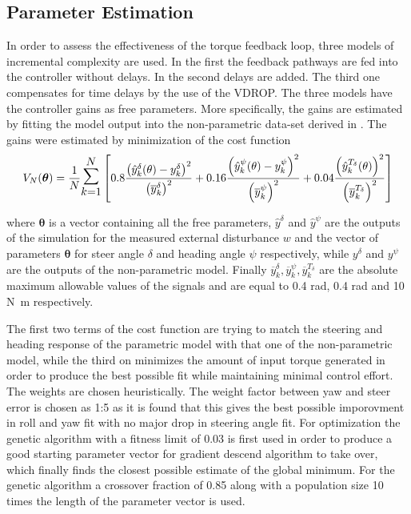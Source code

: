 \subsection{Parameter Estimation }

In order to assess the effectiveness of the torque feedback loop, three models of incremental complexity are used. In the first the feedback pathways are fed into the controller without delays. In the second delays are added. The third one compensates for time delays by the use of the VDROP. The three models have the  controller gains as free parameters. More specifically, the gains are estimated by fitting the model output into the non-parametric data-set derived in \cite{dialynaseffect}.  The gains were estimated by minimization of the cost function 
\begin{equation}
    V_{N}(\boldsymbol{\theta})=\frac{1}{N} \mathlarger{\mathlarger{\mathlarger{\sum}}}_{k=1}^{N}\left[0.8\frac{\left(\hat{y}^{\delta}_k(\mathbf{\theta})-y^\delta_k\right)^{2}}{\left(\overline{y}^{\delta}_k\right)^2}+0.16\frac{\left(\hat{y}^{\psi}_k(\mathbf{\theta})-y^\psi_k\right)^{2}}{\left(\overline{y}^{\psi}_k\right)^2}+0.04\frac{\left(\hat{y}^{T_\delta}_k(\mathbf{\theta})\right)^2}{\left(\overline{y}^{T_\delta}_k\right)^2}\right]
    \label{eq:cost}
    \end{equation}

where \ensuremath{\boldsymbol{\theta}} is a vector containing all the free parameters, \ensuremath{\hat{y}^{\delta}} and \ensuremath{\hat{y}^{\psi}} are the outputs of the simulation for the measured external disturbance \ensuremath{w} and the vector of parameters  \ensuremath{\boldsymbol{\theta}} for steer angle \ensuremath{\delta} and heading angle \ensuremath{\psi}  respectively, while \ensuremath{y^\delta} and \ensuremath{y^\psi} are the outputs of the non-parametric model. Finally \ensuremath{\overline{y}^{\delta}_k,\overline{y}^{\psi}_k,\overline{y}^{T_\delta}_k} are the absolute maximum allowable values of the  signals and are equal to 0.4 \si{\radian}, 0.4 \si{\radian} and 10 \si{N.m} respectively.

The first two terms  of the cost function are trying to match the steering and heading  response of the parametric model with that one of the non-parametric model, while the third on minimizes the amount of input torque generated in order to produce the best possible fit while maintaining minimal control effort. The weights are chosen heuristically. The weight factor between yaw and steer error is chosen as 1:5 as it is found that this gives the best possible imporovment in roll and yaw fit with no major drop in steering angle fit.  For optimization the genetic algorithm with a fitness limit of 0.03 is first  used in order to produce a good starting parameter vector for gradient descend algorithm to take over, which finally finds the closest possible estimate of the global minimum. For the genetic algorithm a crossover fraction of 0.85  along with a population size 10 times the length of the parameter vector is used.


